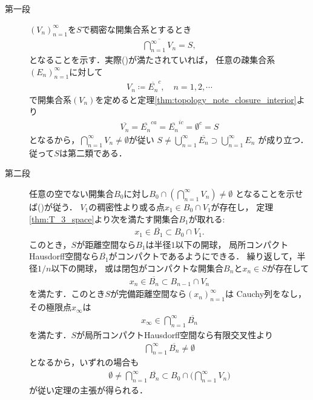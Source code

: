 	\begin{prf}\mbox{}
		\begin{description}
			\item[第一段]
				$(V_n)_{n=1}^\infty$を$S$で稠密な開集合系とするとき
				\begin{align}
					\overline{\bigcap_{n=1}^\infty V_n} = S,
					\label{eq:thm_Baire_category_theorem_1}
				\end{align}
				となることを示す．実際()が満たされていれば，
				任意の疎集合系$(E_n)_{n=1}^\infty$に対して
				\begin{align}
					V_n \coloneqq \overline{E_n}^c,
					\quad n=1,2,\cdots
				\end{align}
				で開集合系$(V_n)$を定めると定理\ref{thm:topology_note_closure_interior}より
				\begin{align}
					\overline{V_n} = \overline{E_n}^{ca} = \overline{E_n}^{ic} = \emptyset^c = S
				\end{align}
				となるから，$\bigcap_{n=1}^\infty V_n \neq \emptyset$が従い
				$S \neq \bigcup_{n=1}^\infty \overline{E_n} \supset \bigcup_{n=1}^\infty E_n$
				が成り立つ．従って$S$は第二類である．
				
			\item[第二段]
				任意の空でない開集合$B_0$に対し$B_0 \cap \left( \bigcap_{n=1}^\infty V_n \right) \neq \emptyset$
				となることを示せば()が従う．
				$V_1$の稠密性より或る点$x_1 \in B_0 \cap V_1$が存在し，
				定理\ref{thm:T_3_space}より次を満たす開集合$B_1$が取れる:
				\begin{align}
					x_1 \in \overline{B_1} \subset B_0 \cap V_1.
					\label{eq:thm_Baire_category_theorem_2}
				\end{align}
				このとき，$S$が距離空間なら$B_1$は半径$1$以下の開球，
				局所コンパクトHausdorff空間なら$\overline{B_1}$がコンパクトであるようにできる．
				繰り返して，半径$1/n$以下の開球，
				或は閉包がコンパクトな開集合$B_n$と$x_n \in S$が存在して
				\begin{align}
					x_n \in \overline{B_n} \subset B_{n-1} \cap V_n
				\end{align}
				を満たす．このとき$S$が完備距離空間なら$(x_n)_{n=1}^\infty$は
				Cauchy列をなし，その極限点$x_\infty$は
				\begin{align}
					x_\infty \in \bigcap_{n=1}^\infty \overline{B_n}
				\end{align}
				を満たす．$S$が局所コンパクトHausdorff空間なら有限交叉性より
				\begin{align}
					\bigcap_{n=1}^\infty \overline{B_n} \neq \emptyset
				\end{align}
				となるから，いずれの場合も
				\begin{align}
					\emptyset \neq \bigcap_{n=1}^\infty \overline{B_n} 
					\subset B_0 \cap \Biggl( \bigcap_{n=1}^\infty V_n \Biggr)
				\end{align}
				が従い定理の主張が得られる．
				\QED
		\end{description}
	\end{prf}
	
